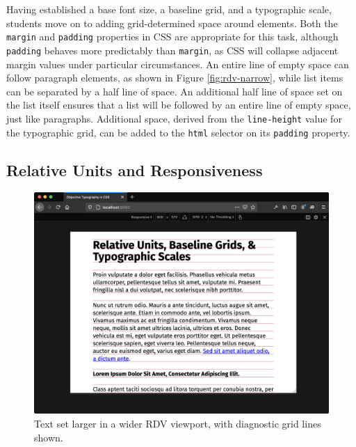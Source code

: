 \documentclass[sigplan,screen]{acmart}
\begin{document}
Having established a base font size, a baseline grid, and a typographic scale, students move on to adding grid-determined space around elements. Both the \verb|margin| and \verb|padding| properties in CSS are appropriate for this task, although \verb|padding| behaves more predictably than \verb|margin|, as CSS will collapse adjacent margin values under particular circumstances.
An entire line of empty space can follow paragraph elements, as shown in Figure \ref{fig:rdv-narrow}, while list items can be separated by a half line of space. An additional half line of space set on the list itself ensures that a list will be followed by an entire line of empty space, just like paragraphs.
Additional space, derived from the \verb|line-height| value for the typographic grid, can be added to the \verb|html| selector on its \verb|padding| property.

\subsection{Relative Units and Responsiveness}

\begin{figure}
  \includegraphics[width=\linewidth]{rdv-wide}
  \caption{Text set larger in a wider RDV viewport, with diagnostic grid lines shown.}
  \label{fig:rdv-wide}
\end{figure}
\end{document}

